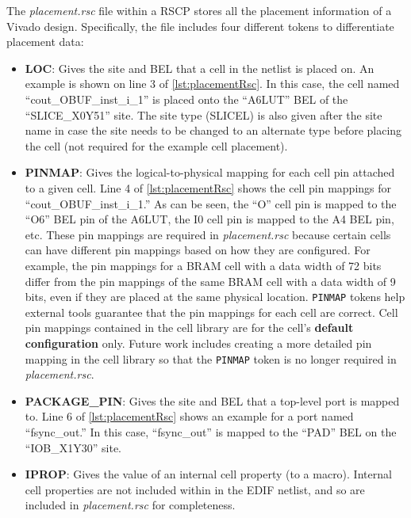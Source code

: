 
The \textit{placement.rsc} file within a RSCP stores all the placement
information of a Vivado design. Specifically, the file includes four different
tokens to differentiate placement data:

\begin{itemize}
  \item \textbf{LOC}: Gives the site and BEL that a cell in the
  netlist is placed on. An example is shown on line 3 of
  \autoref{lst:placementRsc}. In this case, the cell named
  ``cout\_OBUF\_inst\_i\_1'' is placed onto the ``A6LUT'' BEL of the
  ``SLICE\_X0Y51'' site. The site type (SLICEL) is also given after the site
  name in case the site needs to be changed to an alternate type before
  placing the cell (not required for the example cell placement). 
  
  \item \textbf{PINMAP}: Gives the logical-to-physical mapping for each cell
  pin attached to a given cell. Line 4 of \autoref{lst:placementRsc} shows the
  cell pin mappings for ``cout\_OBUF\_inst\_i\_1.'' As can be seen, the
  ``O'' cell pin is mapped to the ``O6'' BEL pin of the A6LUT, the I0 cell pin
  is mapped to the A4 BEL pin, etc. These pin mappings are required in
  \textit{placement.rsc} because certain cells can have different pin mappings
  based on how they are configured.  For example, the pin mappings for a BRAM
  cell with a data width of 72 bits differ from the pin mappings of the same
  BRAM cell with a data width of 9 bits, even if they are placed at the same
  physical location. \texttt{PINMAP} tokens help external tools guarantee
  that the pin mappings for each cell are correct. Cell pin mappings
  contained in the cell library are for the cell's \textbf{default
  configuration} only. Future work includes creating a more detailed pin
  mapping in the cell library so that the \texttt{PINMAP} token is no longer
  required in \textit{placement.rsc}.
  
  \item \textbf{PACKAGE\_PIN}: Gives the site and BEL that a top-level port
  is mapped to. Line 6 of \autoref{lst:placementRsc} shows an example for a port
  named ``fsync\_out.'' In this case, ``fsync\_out'' is mapped to the ``PAD'' BEL on
  the ``IOB\_X1Y30'' site.
  
  \item \textbf{IPROP}: Gives the value of an internal cell property (to a
  macro). Internal cell properties are not included within in the EDIF
  netlist, and so are included in \textit{placement.rsc} for completeness. 
\end{itemize}


